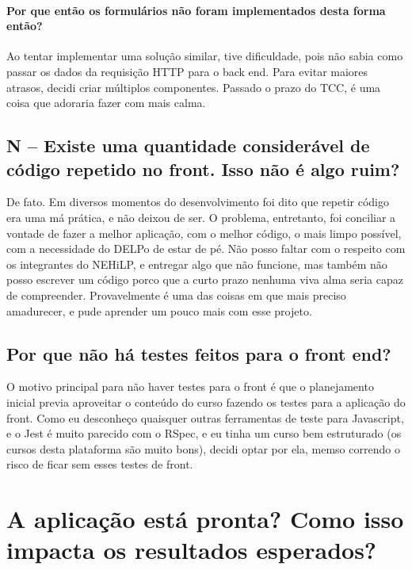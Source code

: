 \paragraph{Por que então os formulários não foram implementados desta forma então?} Ao tentar implementar uma solução
similar, tive dificuldade, pois não sabia como passar os dados da requisição HTTP para o back end. Para evitar maiores
atrasos, decidi criar múltiplos componentes. Passado o prazo do TCC, é uma coisa que adoraria fazer com mais calma.

\subsection{N -- Existe uma quantidade considerável de código repetido no front. Isso não é algo ruim?}
\label{subsec:no-dry}

De fato. Em diversos momentos do desenvolvimento foi dito que repetir código era uma má prática, e não deixou de ser. O
problema, entretanto, foi conciliar a vontade de fazer a melhor aplicação, com o melhor código, o mais limpo possível,
com a necessidade do DELPo de estar de pé. Não posso faltar com o respeito com os integrantes do NEHiLP, e entregar algo
que não funcione, mas também não posso escrever um código porco que a curto prazo nenhuma viva alma seria capaz de
compreender. Provavelmente é uma das coisas em que mais preciso amadurecer, e pude aprender um pouco mais com esse projeto.

\subsection{Por que não há testes feitos para o front end?}\label{subsec:no-tests-for-nuxt}

O motivo principal para não haver testes para o front é que o planejamento inicial previa aproveitar o conteúdo do curso
\href{https://vueschool.io/courses/learn-how-to-test-vuejs-components}{} fazendo os testes
para a aplicação do front. Como eu desconheço quaisquer outras ferramentas de teste para Javascript, e o Jest é muito
parecido com o RSpec, e eu tinha um curso bem estruturado (os cursos desta plataforma são muito bons), decidi optar por
ela, memso correndo o risco de ficar sem esses testes de front.

\section{A aplicação está pronta? Como isso impacta os resultados esperados?}
\label{sec:is-it-ready}

